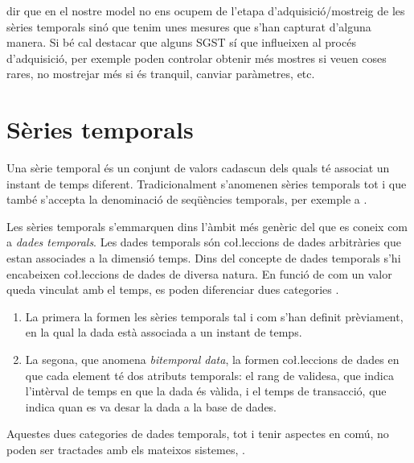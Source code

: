 dir que en el nostre model no ens ocupem de l'etapa d'adquisició/mostreig de les sèries temporals sinó que tenim unes mesures que s'han capturat d'alguna manera. Si bé cal destacar que alguns SGST sí que influeixen al procés d'adquisició, per exemple poden controlar obtenir més mostres si veuen coses rares, no mostrejar més si és tranquil, canviar paràmetres, etc.


\section{Sèries temporals}

Una sèrie temporal és un conjunt de valors cadascun dels quals té
associat un instant de temps diferent.  Tradicionalment s'anomenen
sèries temporals tot i que també s'accepta la denominació de
seqüències temporals, per exemple a \cite{last:hetland}.

Les sèries temporals s'emmarquen dins l'àmbit més genèric del que es
coneix com a \emph{dades temporals}. Les dades temporals són
co\l.leccions de dades arbitràries que estan associades a la dimensió
temps.  Dins del concepte de dades temporals s'hi encabeixen
co\l.leccions de dades de diversa natura. En funció de com un valor
queda vinculat amb el temps, es poden diferenciar dues
categories \parencite{assfalg08:thesis}.
\begin{enumerate}
\item La primera la formen les sèries temporals tal i com s'han
  definit prèviament, en la qual la dada està associada a un instant
  de temps.
\item La segona, que anomena \emph{bitemporal data}, la formen
  co\l.leccions de dades en que cada element té dos atributs
  temporals: el rang de validesa, que indica l'intèrval de temps en
  que la dada és vàlida, i el temps de transacció, que indica quan es
  va desar la dada a la base de dades.  
\end{enumerate}
Aquestes dues categories de dades temporals, tot i tenir aspectes en
comú, no poden ser tractades amb els mateixos
sistemes, \parencite{schmidt95}.


